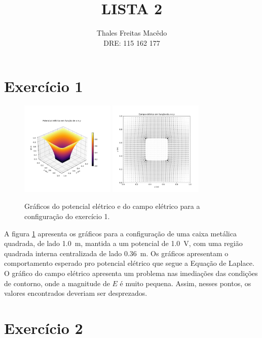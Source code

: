 \documentclass[a4paper, brazil]{article}
\author{Thales Freitas Macêdo \\ DRE: 115 162 177}
\title{LISTA 2}
\begin{document}
\maketitle

\section{Exercício 1}

\begin{figure}[ht]
\centering
\includegraphics[width=0.4\textwidth]{imagem1_V1.pdf}
\includegraphics[width=0.4\textwidth]{imagem1_E1.pdf}
\caption{Gráficos do potencial elétrico e do campo elétrico para a configuração do exercício 1.}\label{fig1}
\end{figure}

A figura \ref{fig1} apresenta os gráficos para a configuração  de uma caixa metálica quadrada, de lado \SI{1.0}{\meter}, mantida a um potencial de \SI{1.0}{\volt}, com uma região quadrada interna centralizada de lado \SI{0.36}{\meter}.
Os gráficos apresentam o comportamento esperado pro potencial elétrico que segue a Equação de Laplace.
O gráfico do campo elétrico apresenta um problema nas imediações das condições de contorno, onde a magnitude de \( E \) é muito pequena.
Assim, nesses pontos, os valores encontrados deveriam ser desprezados.

\newpage
\section{Exercício 2}
\end{document}
